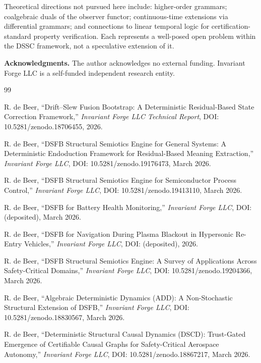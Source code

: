 \documentclass[11pt,a4paper]{article}
\theoremstyle{plain}
\theoremstyle{definition}
\theoremstyle{remark}
\begin{document}
Theoretical directions not pursued here include: higher-order grammars; coalgebraic duals
of the observer functor; continuous-time extensions via differential grammars; and
connections to linear temporal logic for certification-standard property verification.
Each represents a well-posed open problem within the DSSC framework, not a speculative
extension of it.

\vspace{1em}
\textbf{Acknowledgments.} The author acknowledges no external funding. Invariant Forge LLC
is a self-funded independent research entity.

\begin{thebibliography}{99}

R. de Beer, ``Drift--Slew Fusion Bootstrap: A Deterministic Residual-Based State Correction Framework,''
\textit{Invariant Forge LLC Technical Report}, DOI: 10.5281/zenodo.18706455, 2026.

R. de Beer, ``DSFB Structural Semiotics Engine for General Systems: A Deterministic Endoduction Framework for Residual-Based Meaning Extraction,''
\textit{Invariant Forge LLC}, DOI: 10.5281/zenodo.19176473, March 2026.

R. de Beer, ``DSFB Structural Semiotics Engine for Semiconductor Process Control,''
\textit{Invariant Forge LLC}, DOI: 10.5281/zenodo.19413110, March 2026.

R. de Beer, ``DSFB for Battery Health Monitoring,''
\textit{Invariant Forge LLC}, DOI: (deposited), March 2026.

R. de Beer, ``DSFB for Navigation During Plasma Blackout in Hypersonic Re-Entry Vehicles,''
\textit{Invariant Forge LLC}, DOI: (deposited), 2026.

R. de Beer, ``DSFB Structural Semiotics Engine: A Survey of Applications Across Safety-Critical Domains,''
\textit{Invariant Forge LLC}, DOI: 10.5281/zenodo.19204366, March 2026.

R. de Beer, ``Algebraic Deterministic Dynamics (ADD): A Non-Stochastic Structural Extension of DSFB,''
\textit{Invariant Forge LLC}, DOI: 10.5281/zenodo.18830567, March 2026.

R. de Beer, ``Deterministic Structural Causal Dynamics (DSCD): Trust-Gated Emergence of Certifiable Causal Graphs for Safety-Critical Aerospace Autonomy,''
\textit{Invariant Forge LLC}, DOI: 10.5281/zenodo.18867217, March 2026.


\end{thebibliography}
\end{document}
